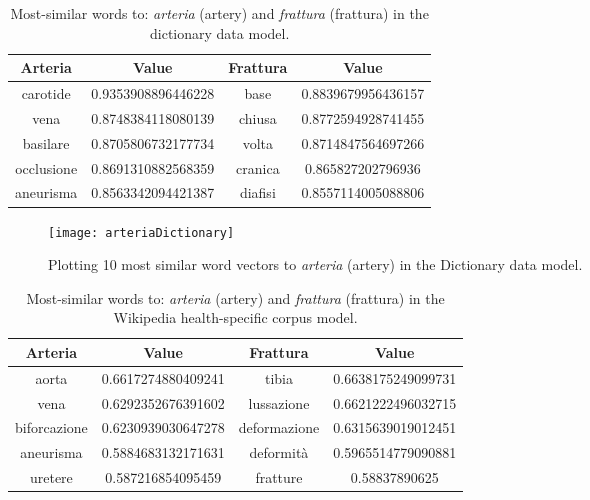 \begin{table}[h!]
	\begin{center}
		\caption[Domain Specific - Most similar words in dictionary corpus model]{Most-similar words to: \textit{arteria} (artery) and \textit{frattura} (frattura) in the dictionary data model.}
		\label{tab:tableDictionary}
		\begin{tabular}{c|S|c|S}
			\toprule
			\textbf{Arteria} & \textbf{Value} & \textbf{Frattura} & \textbf{Value} \\
			\midrule
			carotide & 0.9353908896446228 & base & 0.8839679956436157 \\
			vena & 0.8748384118080139 & chiusa & 0.8772594928741455 \\
			basilare & 0.8705806732177734 & volta & 0.8714847564697266 \\
			occlusione & 0.8691310882568359 & cranica & 0.865827202796936 \\
			aneurisma & 0.8563342094421387 & diafisi & 0.8557114005088806 \\
			\bottomrule
		\end{tabular}
	\end{center}
\end{table}

\begin{figure}[ht]
	\centering
	\texttt{[image: arteriaDictionary]}
	\caption[Artery - 10 most similar words plotted for dictionary corpus model]{Plotting 10 most similar word vectors to \textit{arteria} (artery) in the Dictionary data model.}
	\label{fig:arteriaDictionary}
\end{figure}

\begin{table}[h!]
	\begin{center}
		\caption[Domain Specific - Most similar words in Wikipedia health-specific corpus model]{Most-similar words to: \textit{arteria} (artery) and \textit{frattura} (frattura) in the Wikipedia health-specific corpus model.}
		\label{tab:tableWikipediaSpecific}
		\begin{tabular}{c|S|c|S}
			\toprule
			\textbf{Arteria} & \textbf{Value} & \textbf{Frattura} & \textbf{Value} \\
			\midrule
			aorta & 0.6617274880409241 & tibia & 0.6638175249099731 \\
			vena & 0.6292352676391602 & lussazione & 0.6621222496032715 \\
			biforcazione & 0.6230939030647278 & deformazione & 0.6315639019012451 \\
			aneurisma & 0.5884683132171631 & deformità & 0.5965514779090881 \\
			uretere & 0.587216854095459 & fratture & 0.58837890625 \\
			\bottomrule
		\end{tabular}
	\end{center}
\end{table}

